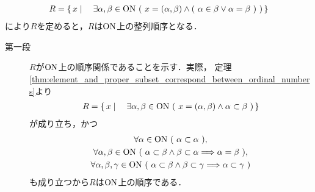 	\begin{screen}
		\begin{thm}[$\ON$の整列性]\label{thm:On_is_wellordered}
			\begin{align}
				R = \Set{x}{\exists \alpha,\beta \in \ON\ 
				(\ x=(\alpha,\beta) \wedge (\ \alpha \in \beta \vee \alpha = \beta\ )\ )}
			\end{align}
			により$R$を定めると，$R$は$\ON$上の整列順序となる．
		\end{thm}
	\end{screen}
	
	\begin{prf}\mbox{}
		\begin{description}
			\item[第一段]
				$R$が$\ON$上の順序関係であることを示す．実際，
				定理\ref{thm:element_and_proper_subset_correspond_between_ordinal_numbers}より
				\begin{align}
					R = \Set{x}{\exists \alpha,\beta \in \ON\ 
						(\ x=(\alpha,\beta) \wedge \alpha \subset \beta\ )}
				\end{align}
				が成り立ち，かつ
				\begin{align}
				\begin{gathered}
					\forall \alpha \in \ON\ (\ \alpha \subset \alpha\ ), \\
					\forall \alpha,\beta \in \ON\ (\ \alpha \subset \beta \wedge 
					\beta \subset \alpha \Longrightarrow \alpha = \beta\ ), \\
					\forall \alpha,\beta,\gamma \in \ON\ (\ \alpha \subset \beta
					\wedge \beta \subset \gamma \Longrightarrow \alpha \subset \gamma\ )
				\end{gathered}
				\end{align}
				も成り立つから$R$は$\ON$上の順序である．
				

\end{description}
\end{prf}

